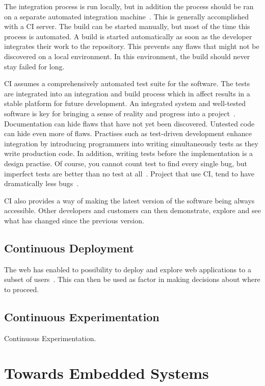 \documentclass[english]{tktltiki2}
\begin{document}
The integration process is run locally, but in addition the process should be ran on a separate automated integration machine~\cite{Fow06}. This is generally accomplished with a CI server. The build can be started manually, but most of the time this process is automated. A build is started automatically as soon as the developer integrates their work to the repository. This prevents any flaws that might not be discovered on a local environment. In this environment, the build should never stay failed for long.

CI assumes a comprehensively automated test suite for the software. The tests are integrated into an integration and build process which in affect results in a stable platform for future development. An integrated system and well-tested software is key for bringing a sense of reality and progress into a project~\cite{Fow05}. Documentation can hide flaws that have not yet been discovered. Untested code can hide even more of flaws. Practises such as test-driven development enhance integration by introducing programmers into writing simultaneously tests as they write production code. In addition, writing tests before the implementation is a design practise. Of course, you cannot count test to find every single bug, but imperfect tests are better than no test at all~\cite{Fow06}. Project that use CI, tend to have dramatically less bugs~\cite{Fow06}.

CI also provides a way of making the latest version of the software being always accessible. Other developers and customers can then demonstrate, explore and see what has changed since the previous version.

\subsection{Continuous Deployment}

The web has enabled to possibility to deploy and explore web applications to a subset of users~\cite{Fow06}. This can then be used as factor in making decisions about where to proceed.

\subsection{Continuous Experimentation}

Continuous Experimentation.


\section{Towards Embedded Systems}
\end{document}
